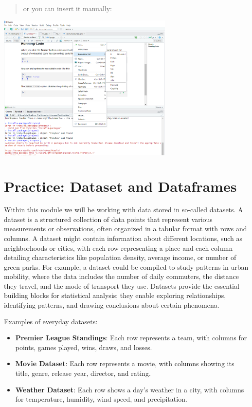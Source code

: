\documentclass[
  letterpaper,
  DIV=11,
  numbers=noendperiod]{scrreprt}
\providecommand{\tightlist}{%
  \setlength{\itemsep}{0pt}\setlength{\parskip}{0pt}}\usepackage{longtable,booktabs,array}
\begin{document}
\begin{quote}
or you can insert it manually:
\end{quote}

\includegraphics[width=3.45in,height=\textheight,keepaspectratio]{labs/../img/codeChunk_visual.png}

\section{Practice: Dataset and
Dataframes}\label{practice-dataset-and-dataframes}

Within this module we will be working with data stored in so-called
datasets. A dataset is a structured collection of data points that
represent various measurements or observations, often organized in a
tabular format with rows and columns. A dataset might contain
information about different locations, such as neighborhoods or cities,
with each row representing a place and each column detailing
characteristics like population density, average income, or number of
green parks. For example, a dataset could be compiled to study patterns
in urban mobility, where the data includes the number of daily
commuters, the distance they travel, and the mode of transport they use.
Datasets provide the essential building blocks for statistical analysis;
they enable exploring relationships, identifying patterns, and drawing
conclusions about certain phenomena.

Examples of everyday datasets:

\begin{itemize}
\tightlist
\item
  \textbf{Premier League Standings}: Each row represents a team, with
  columns for points, games played, wins, draws, and losses.
\item
  \textbf{Movie Dataset}: Each row represents a movie, with columns
  showing its title, genre, release year, director, and rating.
\item
  \textbf{Weather Dataset}: Each row shows a day's weather in a city,
  with columns for temperature, humidity, wind speed, and precipitation.
\end{itemize}
\end{document}
